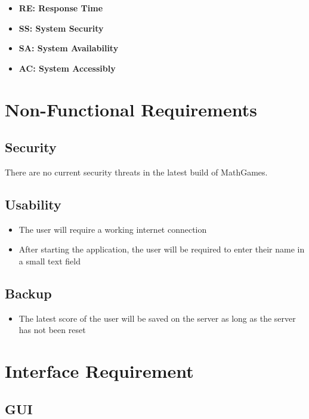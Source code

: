 \documentclass[12pt]{article}
\begin{document}
\begin{itemize}

\item \textbf{RE: Response Time}
\item \textbf{SS: System Security}
\item \textbf{SA: System Availability}
\item \textbf{AC: System Accessibly}

\end{itemize}

\newpage

\section{Non-Functional Requirements}

\subsection{Security}

There are no current security threats in the latest build of MathGames.

\subsection{Usability}

\begin{itemize}
\item The user will require a working internet connection
\item After starting the application, the user will be required to enter their name in a small text field
\end{itemize}

\subsection{Backup}

\begin{itemize}
\item The latest score of the user will be saved on the server as long as the server has not been reset
\end{itemize}

\newpage

\section{Interface Requirement}

\subsection{GUI}
\end{document}
